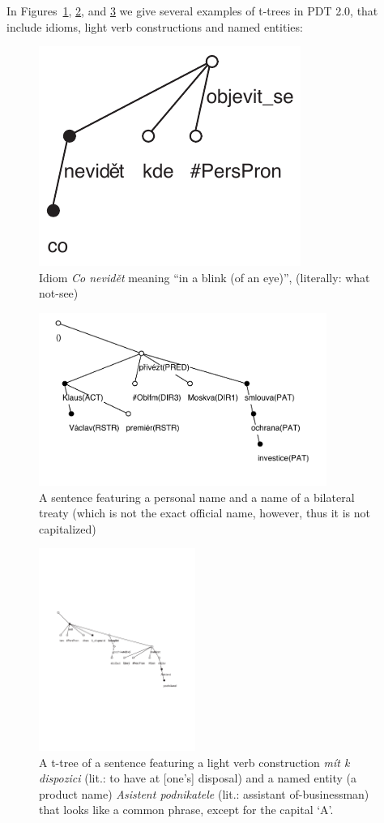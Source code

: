 In Figures~\ref{fig:co-nevidet}, \ref{fig:klaus}, and \ref{fig:asistent} we give several examples of t-trees in PDT 2.0, that include idioms, light verb constructions and named entities:
\begin{figure}[htbp]
   \centerline{\includegraphics[scale=.7]{images/co-nevidet-clause.pdf}}
   \caption{Idiom {\em Co nevidět} meaning ``in a blink (of an eye)'', (literally: what not-see)}
   \label{fig:co-nevidet}
\end{figure}

\begin{figure}[htbp]
   \centerline{\includegraphics[width=3.7in]{images/klaus-a-smlouva.pdf}}
   \caption{A sentence featuring a personal name and a name of a bilateral treaty (which is not the exact official name, however, thus it is not capitalized)}
   \label{fig:klaus}
\end{figure}

\begin{figure}[htbp]
   \centerline{\includegraphics[height=2.6in]{images/as-pod.pdf}}
   \caption{A t-tree of a sentence featuring a light verb construction {\em mít k dispozici} (lit.: to have at [one's] disposal) and a named entity (a product name) {\em Asistent podnikatele} (lit.: assistant of-businessman) that looks like a common phrase, except for the capital `A'.}
   \label{fig:asistent}
\end{figure}

